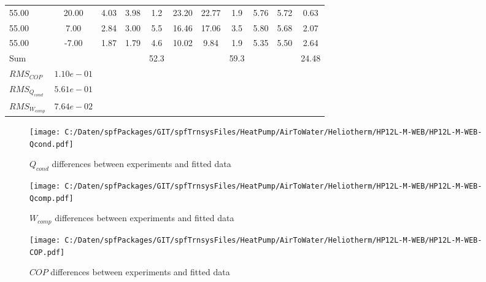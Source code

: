 \documentclass[english]{SPFShortReport}
\begin{document}
\begin{table}[!ht]
\begin{small}
\begin{center}
{\begin{tabular}{l | c c c c c c c c c c }
55.00  & 20.00 & 4.03 & 3.98 & 1.2 & 23.20 & 22.77 & 1.9 & 5.76 & 5.72 & 0.63\\ 
55.00  & 7.00 & 2.84 & 3.00 & 5.5 & 16.46 & 17.06 & 3.5 & 5.80 & 5.68 & 2.07\\ 
55.00  & -7.00 & 1.87 & 1.79 & 4.6 & 10.02 & 9.84 & 1.9 & 5.35 & 5.50 & 2.64\\ 
\hline 
 Sum &  & &  & 52.3 &  &  & 59.3 & &  & 24.48\\ 
\hline 
 $RMS_{COP}$ & $1.10e-01$ \\ 
 $RMS_{Q_{cond}}$ & $5.61e-01$ \\ 
 $RMS_{W_{comp}}$ & $7.64e-02$ \\ 
\hline
\hline
\end{tabular}
}
\label{ErrorsTable}
\end{center}
\end{small}
\end{table}
\begin{figure}[!ht]
\begin{center}
\texttt{[image: C:/Daten/spfPackages/GIT/spfTrnsysFiles/HeatPump/AirToWater/Heliotherm/HP12L-M-WEB/HP12L-M-WEB-Qcond.pdf]}
\caption{$Q_{cond}$ differences between experiments and fitted data}
\label{QcongFig}
\end{center}
\end{figure}
\begin{figure}[!ht]
\begin{center}
\texttt{[image: C:/Daten/spfPackages/GIT/spfTrnsysFiles/HeatPump/AirToWater/Heliotherm/HP12L-M-WEB/HP12L-M-WEB-Qcomp.pdf]}
\caption{$W_{comp}$ differences between experiments and fitted data}
\label{QcompFig}
\end{center}
\end{figure}
\begin{figure}[!ht]
\begin{center}
\texttt{[image: C:/Daten/spfPackages/GIT/spfTrnsysFiles/HeatPump/AirToWater/Heliotherm/HP12L-M-WEB/HP12L-M-WEB-COP.pdf]}
\caption{$COP$ differences between experiments and fitted data}
\label{COPFig}
\end{center}
\end{figure}
\end{document}
